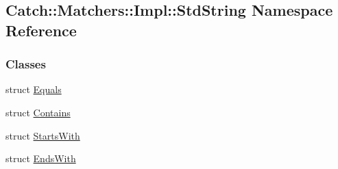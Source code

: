 \hypertarget{namespaceCatch_1_1Matchers_1_1Impl_1_1StdString}{\subsection{Catch\-:\-:Matchers\-:\-:Impl\-:\-:Std\-String Namespace Reference}
\label{namespaceCatch_1_1Matchers_1_1Impl_1_1StdString}
}
\subsubsection*{Classes}
\begin{DoxyCompactItemize}
\item 
struct \hyperlink{structCatch_1_1Matchers_1_1Impl_1_1StdString_1_1Equals}{Equals}
\item 
struct \hyperlink{structCatch_1_1Matchers_1_1Impl_1_1StdString_1_1Contains}{Contains}
\item 
struct \hyperlink{structCatch_1_1Matchers_1_1Impl_1_1StdString_1_1StartsWith}{Starts\-With}
\item 
struct \hyperlink{structCatch_1_1Matchers_1_1Impl_1_1StdString_1_1EndsWith}{Ends\-With}
\end{DoxyCompactItemize}
